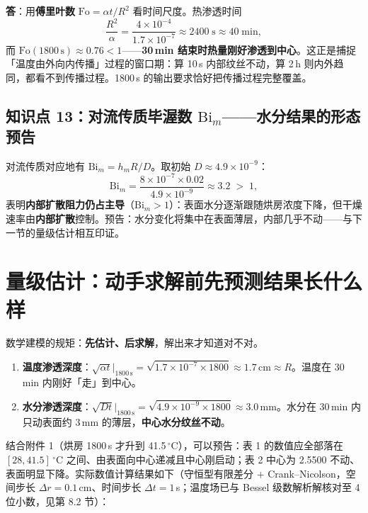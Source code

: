 \documentclass[12pt,a4paper]{ctexart}
\begin{document}
\textbf{答}：用\textbf{傅里叶数} $\mathrm{Fo}=\alpha t/R^2$ 看时间尺度。热渗透时间
\begin{equation}
\frac{R^2}{\alpha}=\frac{4\times10^{-4}}{1.7\times10^{-7}}\approx2400\;\text{s}\approx40\;\text{min},
\end{equation}
而 $\mathrm{Fo}(1800\,\text{s})\approx0.76<1$——\textbf{30\,min 结束时热量刚好渗透到中心}。这正是捕捉「温度由外向内传播」过程的窗口期：算 10\,s 内部纹丝不动，算 2\,h 则内外趋同，都看不到传播过程。1800\,s 的输出要求恰好把传播过程完整覆盖。

\subsection{知识点 13：对流传质毕渥数 $\mathrm{Bi}_m$——水分结果的形态预告}

对流传质对应地有 $\mathrm{Bi}_m=h_mR/D$。取初始 $D\approx4.9\times10^{-9}$：
\begin{equation}
\mathrm{Bi}_m=\frac{8\times10^{-7}\times0.02}{4.9\times10^{-9}}\approx3.2\;>\;1,
\end{equation}
表明\textbf{内部扩散阻力仍占主导}（$\mathrm{Bi}_m>1$）：表面水分逐渐跟随烘房浓度下降，但干燥速率由\textbf{内部扩散}控制。预告：水分变化将集中在表面薄层，内部几乎不动——与下一节的量级估计相互印证。

\section{量级估计：动手求解前先预测结果长什么样}

数学建模的规矩：\textbf{先估计、后求解}，解出来才知道对不对。

\begin{enumerate}[leftmargin=2.5em]
\item \textbf{温度渗透深度}：$\sqrt{\alpha t}\big|_{1800\,\text{s}}=\sqrt{1.7\times10^{-7}\times1800}\approx1.7$\,cm$\approx R$。温度在 30\,min 内刚好「走」到中心。
\item \textbf{水分渗透深度}：$\sqrt{Dt}\big|_{1800\,\text{s}}=\sqrt{4.9\times10^{-9}\times1800}\approx3.0$\,mm。水分在 30\,min 内只动表面约 3\,mm 的薄层，\textbf{中心水分纹丝不动}。
\end{enumerate}

结合附件 1（烘房 1800\,s 才升到 41.5\,$^\circ$C），可以预告：表 1 的数值应全部落在 $[28,41.5]$\,$^\circ$C 之间、由表面向中心递减且中心刚启动；表 2 中心为 2.5500 不动、表面明显下降。实际数值计算结果如下（守恒型有限差分 $+$ Crank--Nicolson，空间步长 $\Delta r=0.1$\,cm、时间步长 $\Delta t=1$\,s；温度场已与 Bessel 级数解析解核对至 4 位小数，见第 8.2 节）：
\end{document}
